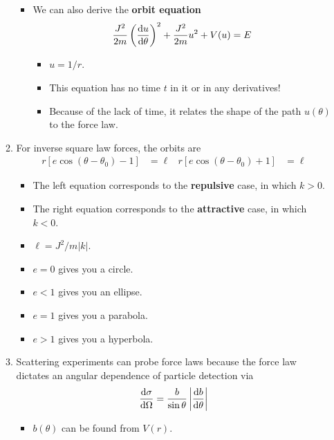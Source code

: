 \documentclass[../notes.tex]{subfiles}
\begin{document}
\begin{itemize}
\begin{enumerate}
\begin{itemize}
\begin{itemize}
            \end{itemize}
            \item We can also derive the \textbf{orbit equation}
            \begin{equation*}
                \frac{J^2}{2m}\left( \dv{u}{\theta} \right)^2+\frac{J^2}{2m}u^2+V(u) = E
            \end{equation*}
            \begin{itemize}
                \item $u=1/r$.
                \item This equation has no time $t$ in it or in any derivatives!
                \item Because of the lack of time, it relates the shape of the path $u(\theta)$ to the force law.
            \end{itemize}
        \end{itemize}
        \item For inverse square law forces, the orbits are
        \begin{align*}
            r[e\cos(\theta-\theta_0)-1] &= \ell&
            r[e\cos(\theta-\theta_0)+1] &= \ell
        \end{align*}
        \begin{itemize}
            \item The left equation corresponds to the \textbf{repulsive} case, in which $k>0$.
            \item The right equation corresponds to the \textbf{attractive} case, in which $k<0$.
            \item $\ell=J^2/m|k|$.
            \item $e=0$ gives you a circle.
            \item $e<1$ gives you an ellipse.
            \item $e=1$ gives you a parabola.
            \item $e>1$ gives you a hyperbola.
        \end{itemize}
        \item Scattering experiments can probe force laws because the force law dictates an angular dependence of particle detection via
        \begin{equation*}
            \dv{\sigma}{\Omega} = \frac{b}{\sin\theta}\left| \dv{b}{\theta} \right|
        \end{equation*}
        \begin{itemize}
            \item $b(\theta)$ can be found from $V(r)$.

\end{itemize}
\end{enumerate}
\end{itemize}
\end{document}
